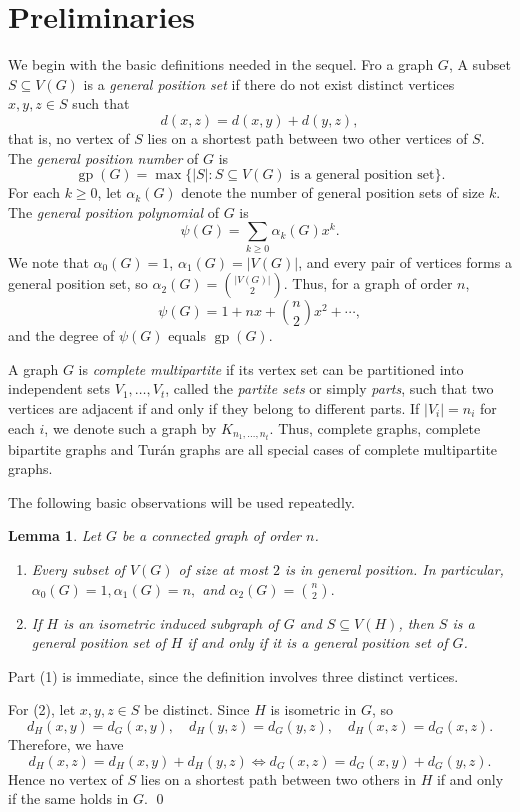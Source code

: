 \documentclass[12pt,twoside]{article}
\newtheorem{lemma}[theorem]{Lemma}
\renewenvironment{proof}{{\noindent\bfseries Proof.}}{\qed}
\begin{document}
	\section{Preliminaries}\label{sec:prelims}
	
	We begin with the basic definitions needed in the sequel. Fro a graph \(G\), A subset \(S\subseteq V(G)\) is a \emph{general position set} if there do not exist distinct vertices \(x,y,z\in S\) such that
		\[
		d(x,z)=d(x,y)+d(y,z),
		\]
		that is, no vertex of \(S\) lies on a shortest path between two other vertices of \(S\). The \emph{general position number} of \(G\) is
		\[
		\operatorname{gp}(G)=\max\{|S|: S\subseteq V(G) \text{ is a general position set}\}.
		\]
		For each \(k\ge 0\), let \(\alpha_k(G)\) denote the number of general position sets of size \(k\). The \emph{general position polynomial} of \(G\) is
		\[
		\psi(G)=\sum_{k\ge 0} \alpha_k(G) x^k.
		\]
	We note that  \(\alpha_0(G)=1\), \(\alpha_1(G)=|V(G)|\), and every pair of vertices forms a general position set, so \(\alpha_2(G)=\binom{|V(G)|}{2}\). Thus, for a graph of order \(n\),
	\[
	\psi(G)=1+nx+\binom{n}{2}x^2+\cdots,
	\]
	and the degree of \(\psi(G)\) equals \(\operatorname{gp}(G)\).
	
	A graph \(G\) is \emph{complete multipartite} if its vertex set can be partitioned into independent sets 	$V_1,\dots,V_t$,  called the \emph{partite sets} or simply \emph{parts}, such that two vertices are adjacent if and only if they belong to different parts. If \(|V_i|=n_i\) for each \(i\), we denote such a graph by $K_{n_1,\dots,n_t}.$  Thus, complete graphs, complete bipartite graphs and Turán graphs are all special cases of complete multipartite graphs.
	
	The following basic observations will be used repeatedly.
	 \begin{lemma}\label{lem:basic-small}
		Let \(G\) be a connected graph of order \(n\).
		\begin{enumerate}
			\item Every subset of \(V(G)\) of size at most \(2\) is in general position. In particular,
			 $\alpha_0(G)=1, \alpha_1(G)=n,$ and $ \alpha_2(G)=\binom{n}{2}.$ 
			\item If \(H\) is an isometric induced subgraph of \(G\) and \(S\subseteq V(H)\), then \(S\) is a general position set of \(H\) if and only if it is a general position set of \(G\).
		\end{enumerate}
	\end{lemma}
	\begin{proof}
		Part (1) is immediate, since the definition involves three distinct vertices.
		
		For (2), let \(x,y,z\in S\) be distinct. Since \(H\) is isometric in \(G\), so
		\[
		d_H(x,y)=d_G(x,y),\quad d_H(y,z)=d_G(y,z),\quad d_H(x,z)=d_G(x,z).
		\]
		Therefore, we have
		\[
		d_H(x,z)=d_H(x,y)+d_H(y,z)
		\iff
		d_G(x,z)=d_G(x,y)+d_G(y,z).
		\]
		Hence no vertex of \(S\) lies on a shortest path between two others in \(H\) if and only if the same holds in \(G\).
	\end{proof}
	
\end{document}
